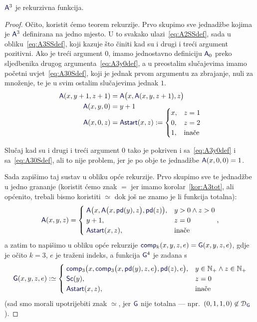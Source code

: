 \begin{propozicija}
    $\f A^3$ je rekurzivna funkcija.
\end{propozicija}
\begin{proof}
Očito, koristit ćemo teorem rekurzije. Prvo skupimo sve jednadžbe kojima je $\f A^3$ definirana na jedno mjesto. U to svakako ulazi~\eqref{eq:A2SSdef}, sada u obliku~\eqref{eq:A3SSdef}, koji kazuje što činiti kad su i drugi i treći argument pozitivni. Ako je treći argument $0$, imamo jednostavno definiciju $\f A_0$ preko sljedbenika drugog argumenta~\eqref{eq:A3y0def}, a u preostalim slučajevima imamo početni uvjet~\eqref{eq:A30Sdef}, koji je jednak prvom argumentu za zbrajanje, nuli za množenje, te je u svim ostalim slučajevima jednak $1$.
\begin{align}
\label{eq:A3SSdef}
    \f A(x,y+1,z+1)&=\f A\bigl(x,\f A(x,y,z+1),z\bigr)\\
\label{eq:A3y0def}
    \f A(x,y,0)&=y+1\\[-3mm]
\label{eq:A30Sdef}
    \f A(x,0,z)&=\f{Astart}(x,z):=\begin{cases}
        x,&z=1\\
        0,&z=2\\
        1,&\text{inače}
    \end{cases}
\end{align}

Slučaj kad su i drugi i treći argument $0$ tako je pokriven i sa~\eqref{eq:A3y0def} i sa~\eqref{eq:A30Sdef}, ali to nije problem, jer je po obje te jednadžbe $\f A(x,0,0)=1$.

Sada zapišimo taj sustav u obliku opće rekurzije. Prvo skupimo sve te jednadžbe u jedno grananje (koristit ćemo znak $=$ jer imamo korolar~\ref{kor:A3tot}, ali općenito, trebali bismo koristiti $\simeq$ dok još ne znamo je li funkcija totalna):
\begin{equation}
    \f A(x,y,z)=\begin{cases}
        \;\f A\bigl(x,\f A\bigl(x,\f{pd}(y),z\bigr),\f{pd}(z)\bigr),&y>0\land z>0\\
        \;y+1,&z=0\\
        \;\f{Astart}(x,z),&\text{inače}
    \end{cases}\text,
\end{equation}
a zatim to napišimo u obliku opće rekurzije $\f{comp}_k(x,y,z,e)=\f G(x,y,z,e)$, gdje je očito $k=3$, $e$ je traženi indeks, a funkcija $\f G^4$ je zadana s
\begin{equation}
    \f G(x,y,z,e):\simeq\begin{cases}
        \;\f{comp}_3\bigl(x,\f{comp}_3\bigl(x,\f{pd}(y),z,e\bigr),\f{pd}(z),e\bigr),&y\in\N_+\land z\in\N_+\\
        \;\f{Sc}(y),&z=0\\
        \;\f{Astart}(x,z),&\text{inače}
    \end{cases}
\end{equation}
(sad smo morali upotrijebiti znak $\simeq$, jer $\f G$ nije totalna --- npr.\ $(0,1,1,0)\not\in\dom{\f G}$).


\end{proof}

